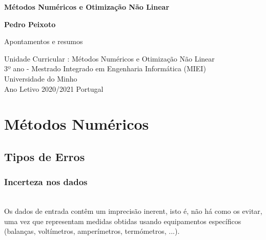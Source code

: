 \documentclass[12pt, a4paper, titlepage, oneside, dvipsnames]{report}
\begin{document}
    \begin{titlepage}
       \begin{center}
           \vspace*{1cm}

           \textbf{Métodos Numéricos e Otimização Não Linear}

           \vspace{0.5cm}

           \vspace{1.5cm}

           \textbf{Pedro Peixoto}

           \vfill

           Apontamentos e resumos\\

           \vspace{0.8cm}


           Unidade Curricular : Métodos Numéricos e Otimização Não Linear\\
           3º ano - Mestrado Integrado em Engenharia Informática (MIEI)\\
           Universidade do Minho\\ 
           Ano Letivo 2020/2021
           Portugal\\

       \end{center}
    \end{titlepage}

    \pagestyle{empty}


    \chapter{Métodos Numéricos}

    \section{Tipos de Erros}

    \subsection{\color{RoyalPurple} Incerteza nos dados}

        \begin{paragraph}\\
        Os dados de entrada contêm um {\color{Mahogany} imprecisão} inerent, isto é, não há como os evitar,
         uma vez que representam medidas obtidas usando equipamentos específicos (balanças, voltímetros, amperímetros, termómetros, ...).
        \end{paragraph}
\end{document}
